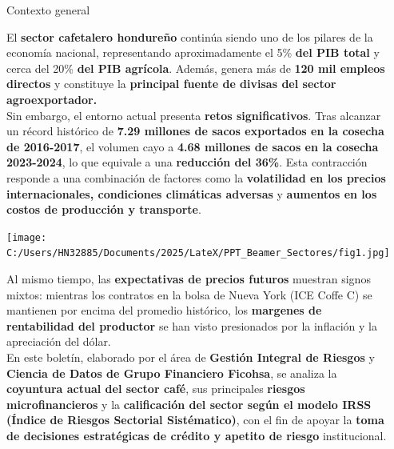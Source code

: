 \documentclass[final]{beamer}
\newlength{\sepwidth}
\newlength{\colwidth}
\newcommand{\separatorcolumn}{\begin{column}{\sepwidth}\end{column}}
\begin{document}
\begin{frame}[t]
\begin{columns}[t]
\separatorcolumn

\begin{column}{\colwidth}

  \begin{block}{Contexto general}

    El \textbf{sector cafetalero hondureño} continúa siendo uno de los pilares de la economía nacional, representando aproximadamente el 5\% \textbf{del PIB total} y cerca del 20\% \textbf{del PIB agrícola}. Además, genera más de \textbf{120 mil empleos directos} y constituye la \textbf{principal fuente de divisas del sector agroexportador.}\\[0.4cm]

   Sin embargo, el entorno actual presenta \textbf{retos significativos}. Tras alcanzar un récord histórico de \textbf{7.29 millones de sacos exportados en la cosecha de 2016-2017}, el volumen cayo a \textbf{4.68 millones de sacos en la cosecha 2023-2024}, lo que equivale a una \textbf{reducción del 36\%}. Esta contracción responde a una combinación de factores como la \textbf{volatilidad en los precios internacionales, condiciones climáticas adversas} y \textbf{aumentos en los costos de producción y transporte}.  
   
   \begin{center}
    \texttt{[image: C:/Users/HN32885/Documents/2025/LateX/PPT\_Beamer\_Sectores/fig1.jpg]}
   \end{center}

Al mismo tiempo, las \textbf{expectativas de precios futuros} muestran signos mixtos: mientras los contratos en la bolsa de Nueva York (ICE Coffe C) se mantienen por encima del promedio histórico, los \textbf{margenes de rentabilidad del productor} se han visto presionados por la inflación y la apreciación del dólar.\\[0.4cm]

En este boletín, elaborado por el área de \textbf{Gestión Integral de Riesgos} y \textbf{Ciencia de Datos de Grupo Financiero Ficohsa}, se analiza la \textbf{coyuntura actual del sector café}, sus principales \textbf{riesgos microfinancieros} y la \textbf{calificación del sector según el modelo IRSS (Índice de Riesgos Sectorial Sistématico)}, con el fin de apoyar la \textbf{toma de decisiones estratégicas de crédito y apetito de riesgo} institucional.


\end{block}
\end{column}
\end{columns}
\end{frame}
\end{document}
